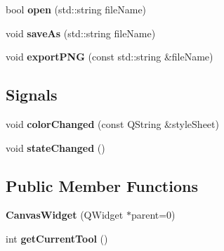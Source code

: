 \begin{DoxyCompactItemize}
\item 
\hypertarget{classCanvasWidget_a5755b2510c0066504e1847759df529cf}{bool {\bfseries open} (std\-::string file\-Name)}\label{classCanvasWidget_a5755b2510c0066504e1847759df529cf}

\item 
\hypertarget{classCanvasWidget_ac7465ba42b77a5a9a36af19073e0279a}{void {\bfseries save\-As} (std\-::string file\-Name)}\label{classCanvasWidget_ac7465ba42b77a5a9a36af19073e0279a}

\item 
\hypertarget{classCanvasWidget_ac3720fa5c118c603aac73bd021a41e94}{void {\bfseries export\-P\-N\-G} (const std\-::string \&file\-Name)}\label{classCanvasWidget_ac3720fa5c118c603aac73bd021a41e94}

\end{DoxyCompactItemize}
\subsection*{Signals}
\begin{DoxyCompactItemize}
\item 
\hypertarget{classCanvasWidget_a40301a55d3c5c4af8fdbb9a70942055c}{void {\bfseries color\-Changed} (const Q\-String \&style\-Sheet)}\label{classCanvasWidget_a40301a55d3c5c4af8fdbb9a70942055c}

\item 
\hypertarget{classCanvasWidget_ac2e5cfa7aac9658bf358af1e9b15d99e}{void {\bfseries state\-Changed} ()}\label{classCanvasWidget_ac2e5cfa7aac9658bf358af1e9b15d99e}

\end{DoxyCompactItemize}
\subsection*{Public Member Functions}
\begin{DoxyCompactItemize}
\item 
\hypertarget{classCanvasWidget_a3056d84c95e47f825ab4be09f48c0662}{{\bfseries Canvas\-Widget} (Q\-Widget $\ast$parent=0)}\label{classCanvasWidget_a3056d84c95e47f825ab4be09f48c0662}

\item 
\hypertarget{classCanvasWidget_a990d94414822524b183a4d90330ab13b}{int {\bfseries get\-Current\-Tool} ()}\label{classCanvasWidget_a990d94414822524b183a4d90330ab13b}

\end{DoxyCompactItemize}
